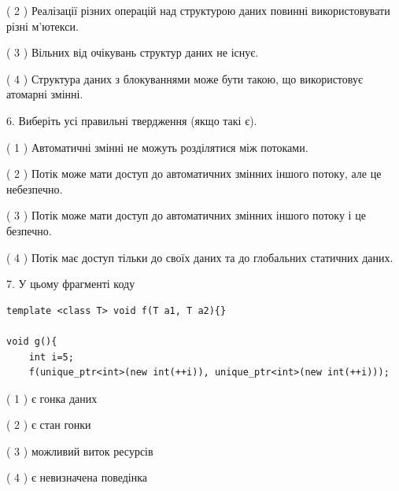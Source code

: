 \documentclass[12pt, ukrainian]{article}
\begin{document}
\begin {large}
{( 2 ) Реалізації різних операцій над структурою даних повинні використовувати різні м’ютекси.%

( 3 ) Вільних від очікувань структур даних не існує.%

( 4 ) Структура даних з блокуваннями може бути такою, що використовує атомарні змінні.%
\newpage



\vspace{5mm}
6. Виберіть усі правильні твердження (якщо такі є).\par
\vspace{2mm}

( 1 ) Автоматичні змінні не можуть розділятися між потоками.%

( 2 ) Потік може мати доступ до автоматичних змінних іншого потоку, але це небезпечно.%

( 3 ) Потік може мати доступ до автоматичних змінних іншого потоку і це безпечно.%

( 4 ) Потік має доступ тільки до своїх даних та до глобальних статичних даних.%


\vspace{5mm}
7. У цьому фрагменті коду
\begin{verbatim}
template <class T> void f(T a1, T a2){}

void g(){
    int i=5;
    f(unique_ptr<int>(new int(++i)), unique_ptr<int>(new int(++i)));
\end{verbatim}

( 1 ) є гонка даних%

( 2 ) є стан гонки%

( 3 ) можливий виток ресурсів%

( 4 ) є невизначена поведінка%
}
\end {large}
\end{document}
